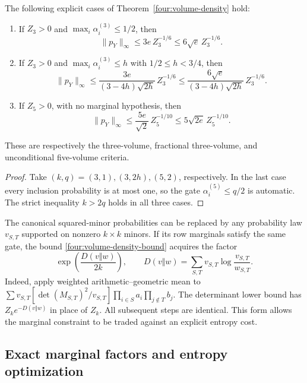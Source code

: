 \begin{corollary}\label{four:d-cases}
The following explicit cases of Theorem~\ref{four:volume-density}
hold:
\begin{enumerate}
\item If \(Z_3>0\) and \(\max_i\alpha_i^{(3)}\leq1/2\), then
\[
 \|p_Y\|_\infty\leq3e\,Z_3^{-1/6}
                         \leq6\sqrt e\,Z_3^{-1/6}.
\]
\item If \(Z_3>0\) and
\(\max_i\alpha_i^{(3)}\leq h\) with \(1/2\leq h<3/4\), then
\[
 \|p_Y\|_\infty
 \leq\frac{3e}{(3-4h)\sqrt{2h}}\,Z_3^{-1/6}
 \leq\frac{6\sqrt e}{(3-4h)\sqrt{2h}}\,Z_3^{-1/6}.
\]
\item If \(Z_5>0\), with no marginal hypothesis, then
\[
 \|p_Y\|_\infty\leq\frac{5e}{\sqrt2}\,Z_5^{-1/10}
                         \leq5\sqrt{2e}\,Z_5^{-1/10}.
\]
\end{enumerate}
These are respectively the three-volume, fractional three-volume,
and unconditional five-volume criteria.
\end{corollary}
\begin{proof}
Take \((k,q)=(3,1),(3,2h),(5,2)\), respectively.  In the last
case every inclusion probability is at most one, so the gate
\(\alpha_i^{(5)}\leq q/2\) is automatic.  The strict inequality
\(k>2q\) holds in all three cases.
\end{proof}

\begin{remark}\label{four:weighted-volume}
The canonical squared-minor probabilities can be replaced by any
probability law \(v_{S,T}\) supported on nonzero \(k\times k\)
minors.  If its row marginals satisfy the same gate, the bound
\eqref{four:volume-density-bound} acquires the factor
\[
 \exp\!\left(\frac{D(v\Vert w)}{2k}\right),\qquad
 D(v\Vert w)=\sum_{S,T}v_{S,T}\log\frac{v_{S,T}}{w_{S,T}}.
\]
Indeed, apply weighted arithmetic--geometric mean to
\(\sum v_{S,T}
 [\det(M_{S,T})^2/v_{S,T}]
 \prod_{i\in S}a_i\prod_{j\notin T}b_j\).
The determinant lower bound has \(Z_k e^{-D(v\Vert w)}\) in
place of \(Z_k\).  All subsequent steps are identical.  This
form allows the marginal constraint to be traded against an
explicit entropy cost.
\end{remark}

\subsection{Exact marginal factors and entropy optimization}

